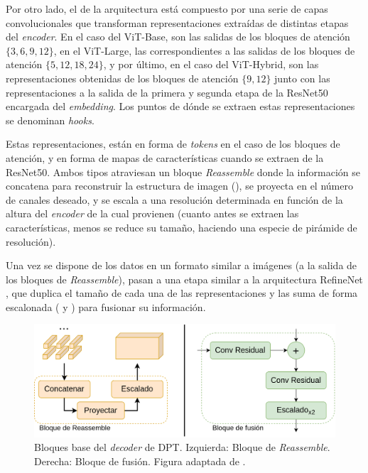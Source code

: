 Por otro lado, el  de la arquitectura está compuesto por una serie de capas convolucionales que transforman representaciones extraídas de distintas etapas del \textit{encoder}. En el caso del ViT-Base, son las salidas de los bloques de atención $\{3, 6, 9, 12\}$, en el ViT-Large, las correspondientes a las salidas de los bloques de atención $\{5, 12, 18, 24\}$, y por último, en el caso del ViT-Hybrid, son las representaciones obtenidas de los bloques de atención $\{9, 12\}$ junto con las representaciones a la salida de la primera y segunda etapa de la ResNet50 encargada del \textit{embedding}. Los puntos de dónde se extraen estas representaciones se denominan \textit{hooks}.

Estas representaciones, están en forma de \textit{tokens} en el caso de los bloques de atención, y en forma de mapas de características cuando se extraen de la ResNet50. Ambos tipos atraviesan un bloque \textit{Reassemble} donde la información se concatena para reconstruir la estructura de imagen (), se proyecta en el número de canales deseado, y se escala a una resolución determinada en función de la altura del \textit{encoder} de la cual provienen (cuanto antes se extraen las características, menos se reduce su tamaño, haciendo una especie de pirámide de resolución).

Una vez se dispone de los datos en un formato similar a imágenes (a la salida de los bloques de \textit{Reassemble}), pasan a una etapa similar a la arquitectura RefineNet \cite{refinenet}, que duplica el tamaño de cada una de las representaciones y las suma de forma escalonada ( y ) para fusionar su información.

\begin{figure}[H]
\centering
\includegraphics[width=0.7\linewidth]{imagenes/reassemble-fusion.png} 
\captionsetup{width=.7\linewidth}
\caption{Bloques base del \textit{decoder} de DPT. Izquierda: Bloque de \textit{Reassemble}. Derecha: Bloque de fusión. Figura adaptada de \cite{visiontransformersDPT}.}
\label{fig:reassemble-fusion}
\end{figure}

